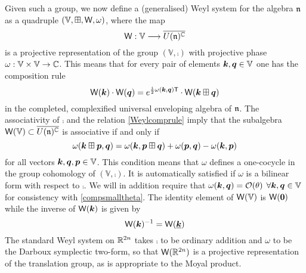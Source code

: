 Given such a group, we now define a (generalised) Weyl system for the algebra
${\mathfrak n}$ as a quadruple $(\mathbb{V},\boxplus,\operatorname{{\sf W}},\omega)$, where the map
\begin{equation}
  \label{genweylmapdef}
  \operatorname{{\sf W}} : \mathbb{V} \longrightarrow \overline{U({\mathfrak n})^{\mathbb C}}
\end{equation}
is a projective representation of the group $(\mathbb{V},\comp)$ with projective
phase $\omega:\mathbb{V}\times\mathbb{V}\to{\mathbb C}$. This means that for every
pair of elements ${{\boldsymbol {k} }},{{\boldsymbol {q} }}\in\mathbb{V}$ one has the composition rule
\begin{equation}
  \label{Weylcomprule}
  \operatorname{{\sf W}}({{\boldsymbol {k} }})\cdot\operatorname{{\sf W}}({{\boldsymbol {q} }})= e^{\frac i2 \omega({{\boldsymbol {k} }},{{\boldsymbol {q} }}) {\sf T}} \cdot 
  \operatorname{{\sf W}}({{\boldsymbol {k} }}\boxplus{{\boldsymbol {q} }})
\end{equation}
in the completed, complexified universal enveloping algebra of ${\mathfrak n}$. The
associativity of $\comp$ and the relation \eqref{Weylcomprule} imply that the
subalgebra $\operatorname{{\sf W}}(\mathbb{V})\subset\overline{U({\mathfrak n})^{\mathbb C}}$ is associative
if and only if
\begin{equation}
  \label{cocyclecond}
  \omega({{\boldsymbol {k} }}\boxplus{\boldsymbol {p} },{{\boldsymbol {q} }})=\omega({{\boldsymbol {k} }},{\boldsymbol {p} }\boxplus{{\boldsymbol {q} }})+\omega({\boldsymbol {p} },{{\boldsymbol {q} }})-
  \omega({{\boldsymbol {k} }},{\boldsymbol {p} })
\end{equation}
for all vectors ${{\boldsymbol {k} }},{{\boldsymbol {q} }},{\boldsymbol {p} }\in{\mathbb V}$. This condition means that $\omega$
defines a one-cocycle in the group cohomology of $(\mathbb{V},\comp)$. It is
automatically satisfied if $\omega$ is a bilinear form with respect to $\comp$.
We will in addition require that $\omega({{\boldsymbol {k} }},{{\boldsymbol {q} }})={\mathcal O}(\theta)$ $\forall
{{\boldsymbol {k} }},{{\boldsymbol {q} }}\in\mathbb{V}$ for consistency with \eqref{compsmalltheta}. The identity
element of $\operatorname{{\sf W}}(\mathbb{V})$ is $\operatorname{{\sf W}}({\boldsymbol {0} })$ while the inverse of
$\operatorname{{\sf W}}({{\boldsymbol {k} }})$ is given by
\begin{equation}
  \label{weylinverse}
  \operatorname{{\sf W}}({{\boldsymbol {k} }})^{-1}=\operatorname{{\sf W}}( \underline{{{\boldsymbol {k} }}} )
\end{equation}
The standard Weyl system on ${\mathbb R}^{2n}$ takes $\comp$ to be ordinary addition
and $\omega$ to be the Darboux symplectic two-form, so that $\operatorname{{\sf W}}({\mathbb R}^{2n})$
is a projective representation of the translation group, as is appropriate to
the Moyal product.

